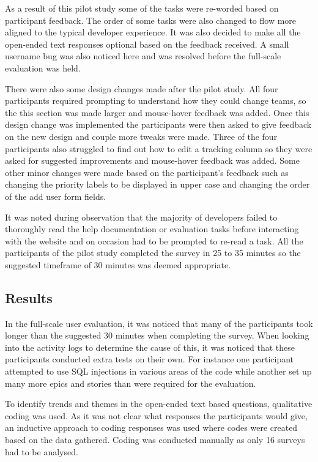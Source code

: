 \documentclass[l4proj.tex]{subfiles}
\begin{document}
As a result of this pilot study some of the tasks were re-worded based on participant feedback. The order of some tasks were also changed to flow more aligned to the typical developer experience. It was also decided to make all the open-ended text responses optional based on the feedback received. A small username bug was also noticed here and was resolved before the full-scale evaluation was held.

There were also some design changes made after the pilot study. All four participants required prompting to understand how they could change teams, so the this section was made larger and mouse-hover feedback was added. Once this design change was implemented the participants were then asked to give feedback on the new design and couple more tweaks were made. Three of the four participants also struggled to find out how to edit a tracking column so they were asked for suggested improvements and mouse-hover feedback was added. Some other minor changes were made based on the participant's feedback such as changing the priority labels to be displayed in upper case and changing the order of the add user form fields.

It was noted during observation that the majority of developers failed to thoroughly read the help documentation or evaluation tasks before interacting with the website and on occasion had to be prompted to re-read a task. All the participants of the pilot study completed the survey in 25 to 35 minutes so the suggested timeframe of 30 minutes was deemed appropriate.


\subsection{Results}
In the full-scale user evaluation, it was noticed that many of the participants took longer than the suggested 30 minutes when completing the survey. When looking into the activity logs to determine the cause of this, it was noticed that these participants conducted extra tests on their own. For instance one participant attempted to use SQL injections in various areas of the code while another set up many more epics and stories than were required for the evaluation. 

To identify trends and themes in the open-ended text based questions, qualitative coding was used. As it was not clear what responses the participants would give, an inductive approach to coding responses was used where codes were created based on the data gathered. Coding was conducted manually as only 16 surveys had to be analysed.
\end{document}
